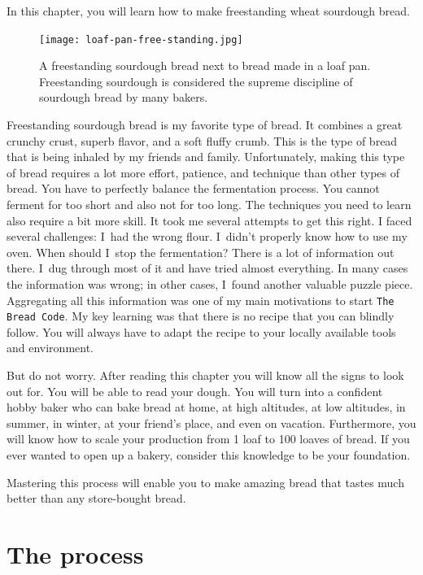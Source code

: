 \begin{quoting}
In this chapter, you will learn how to make
freestanding wheat sourdough bread.
\end{quoting}

\begin{figure}[!htb]
  \texttt{[image: loaf-pan-free-standing.jpg]}
  \caption[Freestanding and loaf pan bread]{A freestanding sourdough bread
      next to bread made in a loaf pan.  Freestanding sourdough is considered
      the supreme discipline of sourdough bread by many bakers.}
\end{figure}

Freestanding sourdough bread is my favorite
type of bread. It combines a great crunchy crust, superb
flavor, and a soft fluffy crumb. This is the type of bread
that is being inhaled by my friends and family. Unfortunately,
making this type of bread requires a lot more effort, patience,
and technique than other types of bread. You have to perfectly
balance the fermentation process. You cannot ferment for too
short and also not for too long. The techniques you need to
learn also require a bit more skill. It took me several attempts
to get this right. I faced several challenges: I~had the wrong flour.
I~didn't properly know how to use my oven.
When should I~stop the fermentation? There is a lot of information
out there. I~dug through most of it and have tried almost everything.
In many cases the information was wrong; in other cases, I~found another
valuable puzzle piece. Aggregating all this
information was one of my main motivations to start \texttt{The Bread Code}.
My key learning was that there is no recipe that
you can blindly follow. You will always have to adapt the recipe
to your locally available tools and environment.

But do not worry. After reading this chapter you will know
all the signs to look out for. You will be able to read your dough.
You will turn into a confident hobby baker who can bake bread
at home, at high altitudes, at low altitudes, in summer, in winter,
at your friend's place, and even on vacation. Furthermore,
you will know how to scale your production from 1 loaf to 100 loaves of bread.
If you ever wanted to open up a bakery, consider this knowledge to
be your foundation.

Mastering this process will enable you to make amazing bread
that tastes much better than any store-bought bread.

\section{The process}

